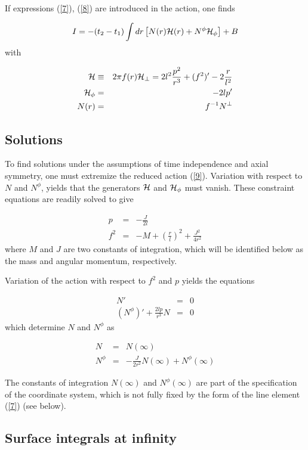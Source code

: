 \documentclass[12pt]{article}
\newcounter{c1} \newcounter{c2}
\newcommand{\bb}{\begin{equation}}
\newcommand{\ee}{\end{equation}}
\newcommand{\br}{\begin{eqnarray}}
\newcommand{\er}{\end{eqnarray}}
\begin{document}
If expressions (\ref{7}), (\ref{8}) are introduced in the action, one finds

\bb
I= -(t_2 -t_1)\int dr\left[ N(r){\cal H}(r) +N^{\phi}{\cal
H}_{\phi} \right] + B
\label{9}
\ee
%
with

\br
 {\cal H} & \equiv & 2 \pi f(r){\cal H}_{\perp} = 2l^2 \frac{p^2}{r^3} +
(f^2)' -2\frac{r}{l^2} \\
{\cal H}_{\phi} & = & -2 lp' \\
N(r) & = & f^{-1}N^{\perp} \label{N}
\er


\subsection{Solutions }

To find solutions under the assumptions of time independence and
axial symmetry, one must extremize the reduced action (\ref{9}).
Variation with respect to $N$ and $N^{\phi}$, yields that
the generators ${\cal H}$ and ${\cal H}_{\phi}$ must vanish.
These constraint equations are readily solved to give

\br
p & = & -\frac{J}{2l} \nonumber \\
f^2 & = & -M + \left(\frac{r}{l}\right)^2 + \frac{J^2}{4r^2}
\label{sol:p}
\er
%
where $M$ and $J$ are two constants of integration, which will be
identified below as the mass and angular momentum, respectively.

Variation of the action with respect to $f^2$ and $p$ yields the
equations

\br
  N'& = & 0\nonumber \\
(N^{\phi})' + \frac{2lp}{r^3} N    & = & 0
\label{14}
\er
%
which determine $N$ and $N^{\phi}$ as

\br
N & = & N(\infty)\nonumber \\
N^{\phi} & = & - \frac{J}{2r^2}N(\infty) + N^{\phi}(\infty)
\label{2.15}
\er

The constants of integration $N(\infty)$ and $N^{\phi}
(\infty)$ are part of the specification of the coordinate
system, which is not fully fixed by the form of the line element
(\ref{7}) (see below).



\subsection{ Surface integrals at infinity }
\end{document}
